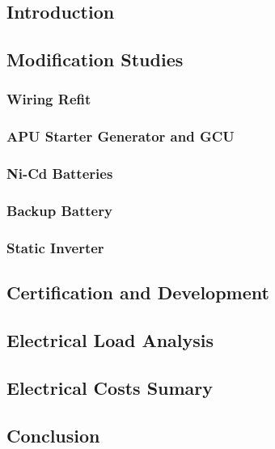 \subsection{Introduction}
	

\subsection{Modification Studies}
    \subsubsection{Wiring Refit}
        
    \subsubsection{APU Starter Generator and GCU}
        
    \subsubsection{Ni-Cd Batteries}
        
    \subsubsection{Backup Battery}
        
    \subsubsection{Static Inverter}
        

\subsection{Certification and Development}
         

\subsection{Electrical Load Analysis}
         

\subsection{Electrical Costs Sumary}
         

\subsection{Conclusion}
         

